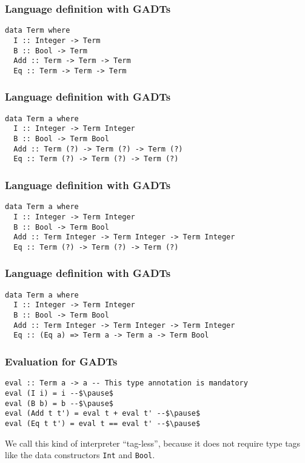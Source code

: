 \documentclass[pdftex,aspectratio=169]{beamer}
\begin{document}
\begin{frame}[fragile]
  \frametitle{Language definition with GADTs}
  \begin{block}{}
    \begin{lstlisting}
data Term where
  I :: Integer -> Term
  B :: Bool -> Term
  Add :: Term -> Term -> Term
  Eq :: Term -> Term -> Term   
    \end{lstlisting}
  \end{block}
\end{frame}

\begin{frame}[fragile]
  \frametitle{Language definition with GADTs}
  \begin{block}{}
    \begin{lstlisting}
data Term a where
  I :: Integer -> Term Integer
  B :: Bool -> Term Bool
  Add :: Term (?) -> Term (?) -> Term (?)
  Eq :: Term (?) -> Term (?) -> Term (?)
    \end{lstlisting}
  \end{block}
\end{frame}

\begin{frame}[fragile]
  \frametitle{Language definition with GADTs}
  \begin{block}{}
    \begin{lstlisting}
data Term a where
  I :: Integer -> Term Integer
  B :: Bool -> Term Bool
  Add :: Term Integer -> Term Integer -> Term Integer
  Eq :: Term (?) -> Term (?) -> Term (?)
    \end{lstlisting}
  \end{block}
\end{frame}

\begin{frame}[fragile]
  \frametitle{Language definition with GADTs}
  \begin{block}{}
    \begin{lstlisting}
data Term a where
  I :: Integer -> Term Integer
  B :: Bool -> Term Bool
  Add :: Term Integer -> Term Integer -> Term Integer
  Eq :: (Eq a) => Term a -> Term a -> Term Bool
    \end{lstlisting}
  \end{block}
\end{frame}

\begin{frame}[fragile]
  \frametitle{Evaluation for GADTs}
  \begin{block}{}
    \begin{lstlisting}
eval :: Term a -> a -- This type annotation is mandatory
eval (I i) = i --$\pause$
eval (B b) = b --$\pause$
eval (Add t t') = eval t + eval t' --$\pause$
eval (Eq t t') = eval t == eval t' --$\pause$
    \end{lstlisting}
  \end{block}\pause

  We call this kind of interpreter ``tag-less'', because it does not
  require type tags like the data constructors \lstinline{Int} and \lstinline{Bool}.
\end{frame}
\end{document}
